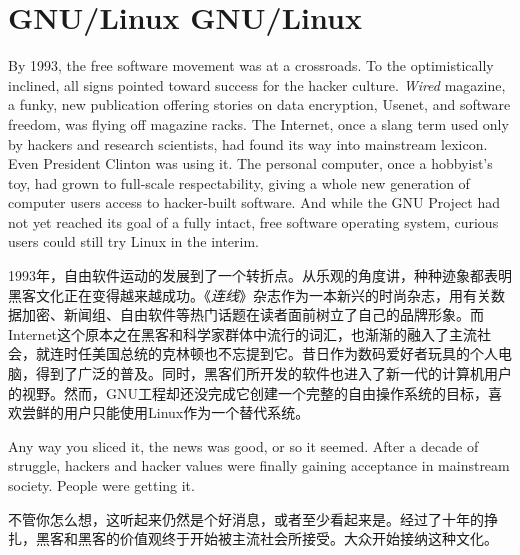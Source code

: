 

\chapter{\ifdefined\eng
GNU/Linux
\fi
\ifdefined\chs
GNU/Linux
\fi}

\ifdefined\eng
By 1993, the free software movement was at a crossroads. To the optimistically inclined, all signs pointed toward success for the hacker culture. \textit{Wired} magazine, a funky, new publication offering stories on data encryption, Usenet, and software freedom, was flying off magazine racks. The Internet, once a slang term used only by hackers and research scientists, had found its way into mainstream lexicon. Even President Clinton was using it. The personal computer, once a hobbyist's toy, had grown to full-scale respectability, giving a whole new generation of computer users access to hacker-built software. And while the GNU Project had not yet reached its goal of a fully intact, free software operating system, curious users could still try Linux in the interim.
\fi

\ifdefined\chs
1993年，自由软件运动的发展到了一个转折点。从乐观的角度讲，种种迹象都表明黑客文化正在变得越来越成功。《\textit{连线}》杂志作为一本新兴的时尚杂志，用有关数据加密、新闻组、自由软件等热门话题在读者面前树立了自己的品牌形象。而Internet这个原本之在黑客和科学家群体中流行的词汇，也渐渐的融入了主流社会，就连时任美国总统的克林顿也不忘提到它。昔日作为数码爱好者玩具的个人电脑，得到了广泛的普及。同时，黑客们所开发的软件也进入了新一代的计算机用户的视野。然而，GNU工程却还没完成它创建一个完整的自由操作系统的目标，喜欢尝鲜的用户只能使用Linux作为一个替代系统。
\fi

\ifdefined\eng
Any way you sliced it, the news was good, or so it seemed. After a decade of struggle, hackers and hacker values were finally gaining acceptance in mainstream society. People were getting it.
\fi

\ifdefined\chs
不管你怎么想，这听起来仍然是个好消息，或者至少看起来是。经过了十年的挣扎，黑客和黑客的价值观终于开始被主流社会所接受。大众开始接纳这种文化。
\fi

